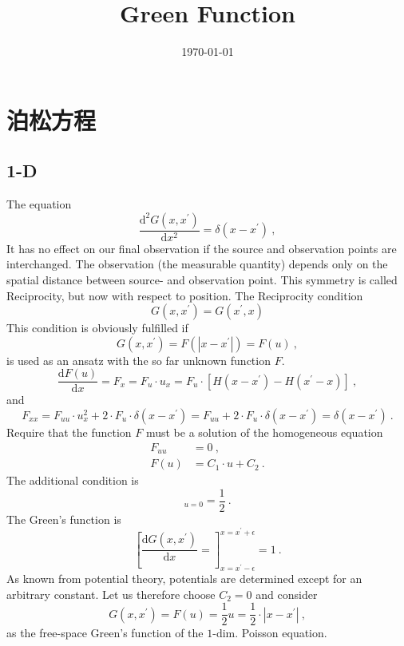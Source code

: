 \documentclass[11pt,a4paper]{article}
\title{Green Function}
\author{}
\date{\today}
\newcommand{\dif}{\mathrm{d}}
\begin{document}
\maketitle

\section{泊松方程}

\subsection{1-D}
\cite{Rother:2256622} The equation
\begin{equation}
\dfrac{\dif^2 G(x, x^\prime)}{\dif x^2} = \delta(x-x^\prime) ~,
\end{equation}
It has no effect on our final observation if the source and observation points are interchanged. The observation (the measurable quantity) depends only on the spatial distance between source- and observation point. This symmetry is called Reciprocity, but now with respect to position. The Reciprocity condition
\begin{equation}
G(x, x^\prime) = G( x^\prime, x)
\end{equation}
This condition is obviously fulfilled if
\begin{equation}
G(x, x^\prime) = F(|x-x^\prime|) = F(u) ~,
\end{equation}
is used as an ansatz with the so far unknown function $F$. 
\begin{equation}
\dfrac{\dif F(u)}{\dif x} = F_x = F_u \cdot u_x = F_u \cdot [H(x-x^\prime) -H(x^\prime-x) ] ~,
\end{equation}
and
\begin{equation}
F_{xx} = F_{uu} \cdot u_x^2 + 2\cdot F_u \cdot \delta(x-x^\prime) = F_{uu} +2\cdot F_u\cdot \delta(x-x^\prime) = \delta(x-x^\prime) ~.
\end{equation}
Require that the function $F$ must be a solution of the homogeneous equation
\begin{align}
F_{uu} &= 0 ~, \\
F(u) &= C_1\cdot u +C_2 ~.
\end{align}
The additional condition is
\begin{equation}
[F_u]_{u = 0 } = \dfrac{1}{2} ~.
\end{equation}
The Green's function is
\begin{equation}
\left[\dfrac{\dif G(x, x^\prime)}{\dif x} = \right]_{x=x^\prime-\epsilon}^{x=x^\prime+\epsilon} = 1 ~.
\end{equation}
As known from potential theory, potentials are determined except for an arbitrary constant. Let us therefore choose $C_2 = 0$ and consider
\begin{equation}
G(x, x^\prime) = F(u) = \dfrac{1}{2}u =  \dfrac{1}{2} \cdot |x-x^\prime| ~,
\end{equation}
as the free-space Green's function of the $1$-dim. Poisson equation.
\end{document}
